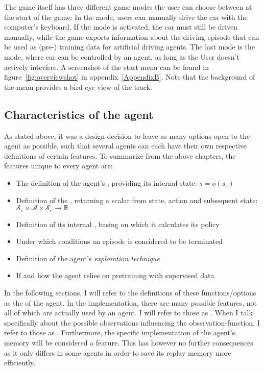 The game itself has three different game modes the user can choose between at the start of the game: In the  mode, users can manually drive the car with the computer's keyboard. If the  mode is activated, the car must still be driven manually, while the game exports information about the driving episode that can be used as (pre-) training data for artificial driving agents. The last mode is the  mode, where car can be controlled by an agent, as long as the User doesn't actively interfere. A screenshot of the start menu can be found in figure~\ref{fig:overviewshot} in appendix~\ref{AppendixB}. Note that the background of the menu provides a bird-eye view of the track.

\subsection{Characteristics of the agent}
\label{ch:agentchars}

As stated above, it was a design decision to leave as many options open to the agent as possible, such that several agents can each have their own respective definitions of certain features. To summarize from the above chapters, the features unique to every agent are:
\begin{itemize}
	\item The definition of the agent's , providing its internal state: $s = o(s_e)$
	\item Definition of the , returning a scalar from state, action and subsequent state: $\mathcal{S}_e \times \mathcal{A} \times \mathcal{S}_e \rightarrow \mathds{R}$
	\item Definition of its internal , basing on which it calculates its policy
	\item Under which conditions an episode is considered to be terminated 
	\item Definition of the agent's \textit{exploration technique}
	\item If and how the agent relies on pretraining with supervised data	
\end{itemize}
\begin{flushright}
	\scriptsize
	In the following sections, I will refer to the definitions of these functions/options as the  of the agent. In the implementation, there are many possible features, not all of which are actually used by an agent. I will refer to those as . When I talk specifically about the possible observations influencing the observation-function, I refer to those as . Furthermore, the specific implementation of the agent's memory will be considered a feature. This has however no further consequences as it only differs in some agents in order to save its replay memory more efficiently.
\end{flushright}

